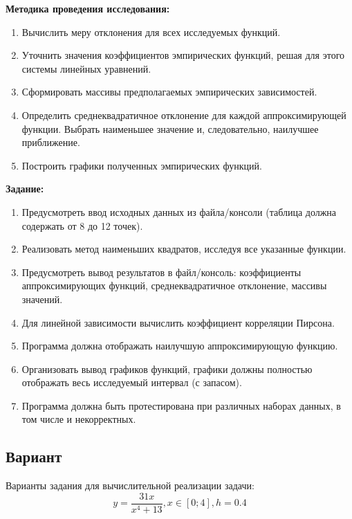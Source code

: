 \documentclass{article}
\begin{document}
            \textbf{Методика проведения исследования:}
            \begin{enumerate}
                  \item Вычислить меру отклонения для всех исследуемых функций.
                  \item Уточнить значения коэффициентов эмпирических функций, решая для этого системы линейных уравнений.
                  \item Сформировать массивы предполагаемых эмпирических зависимостей.
                  \item Определить среднеквадратичное отклонение для каждой аппроксимирующей функции. Выбрать наименьшее значение и, следовательно, наилучшее приближение.
                  \item Построить графики полученных эмпирических функций.
            \end{enumerate}

            \textbf{Задание:}
            \begin{enumerate}
                  \item Предусмотреть ввод исходных данных из файла/консоли (таблица должна содержать от 8 до 12 точек).
                  \item Реализовать метод наименьших квадратов, исследуя все указанные функции.
                  \item Предусмотреть вывод результатов в файл/консоль: коэффициенты аппроксимирующих функций, среднеквадратичное отклонение, массивы значений.
                  \item Для линейной зависимости вычислить коэффициент корреляции Пирсона.
                  \item Программа должна отображать наилучшую аппроксимирующую функцию.
                  \item Организовать вывод графиков функций, графики должны полностью отображать весь исследуемый интервал (с запасом).
                  \item Программа должна быть протестирована при различных наборах данных, в том числе и некорректных.
            \end{enumerate}

\subsection{Вариант}

Варианты задания для вычислительной реализации задачи: 
 $$y=\frac{31x}{x^4+13}, x\in[0;4], h=0.4$$
\end{document}

